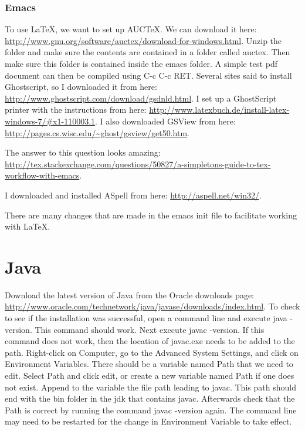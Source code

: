 \documentclass{article}
\begin{document}
\subsubsection{Emacs}
\label{subsubsec:LaTeX_Emacs}

To use \LaTeX, we want to set up AUC\TeX.
We can download it here: \url{http://www.gnu.org/software/auctex/download-for-windows.html}.
Unzip the folder and make sure the contents are contained in a folder called auctex.
Then make sure this folder is contained inside the emacs folder.
A simple test pdf document can then be compiled using C-c C-c RET.
Several sites said to install Ghostscript, so I downloaded it from here:
	\url{http://www.ghostscript.com/download/gsdnld.html}.
I set up a GhostScript printer with the instructions from here:
	\url{http://www.latexbuch.de/install-latex-windows-7/#x1-110003.1}.
I also downloaded GSView from here: \url{http://pages.cs.wisc.edu/~ghost/gsview/get50.htm}.

The answer to this question looks amazing:
	\url{http://tex.stackexchange.com/questions/50827/a-simpletons-guide-to-tex-workflow-with-emacs}.

I downloaded and installed ASpell from here: \url{http://aspell.net/win32/}.

There are many changes that are made in the emacs init file to facilitate working with \LaTeX.

\section{Java}

Download the latest version of Java from the Oracle downloads page:
 	\url{http://www.oracle.com/technetwork/java/javase/downloads/index.html}.
To check to see if the installation was successful, open a command line and execute java -version.
This command should work.
Next execute javac -version.
If this command does not work, then the location of javac.exe needs to be added to the path.
Right-click on Computer, go to the Advanced System Settings, and click on Environment Variables.
There should be a variable named Path that we need to edit.
Select Path and click edit, or create a new variable named Path if one does not exist.
Append to the variable the file path leading to javac.
This path should end with the bin folder in the jdk that contains javac.
Afterwards check that the Path is correct by running the command javac -version again.
The command line may need to be restarted for the change in Environment Variable to take effect.
\end{document}
